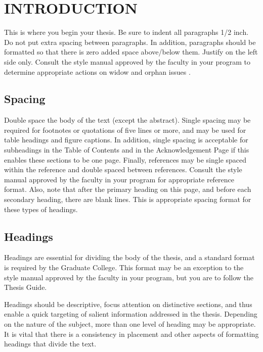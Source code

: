 \doublespacing

\chapter*{INTRODUCTION}
This is where you begin your thesis. Be sure to indent all paragraphs 1/2 inch. Do not put extra spacing between paragraphs. In addition, paragraphs should be formatted so that there is zero added space above/below them. Justify on the left side only. Consult the style manual approved by the faculty in your program to determine appropriate actions on widow and orphan issues \cite{article-minimal}.

\section{Spacing}
Double space the body of the text (except the abstract). Single spacing may be required for footnotes or quotations of five lines or more, and may be used for table headings and figure captions. In addition, single spacing is acceptable for subheadings in the Table of Contents and in the Acknowledgement Page if this enables these sections to be one page. Finally, references may be single spaced within the reference and double spaced between references. Consult the style manual approved by the faculty in your program for appropriate reference format. Also, note that after the primary heading on this page, and before each secondary heading, there are blank lines. This is appropriate spacing format for these types of headings.

\section{Headings}
Headings are essential for dividing the body of the thesis, and a standard format is required by the Graduate College. This format may be an exception to the style manual approved by the faculty in your program, but you are to follow the Thesis Guide.

Headings should be descriptive, focus attention on distinctive sections, and thus enable a quick targeting of salient information addressed in the thesis. Depending on the nature of the subject, more than one level of heading may be appropriate. It is vital that there is a consistency in placement and other aspects of formatting headings that divide the text.

